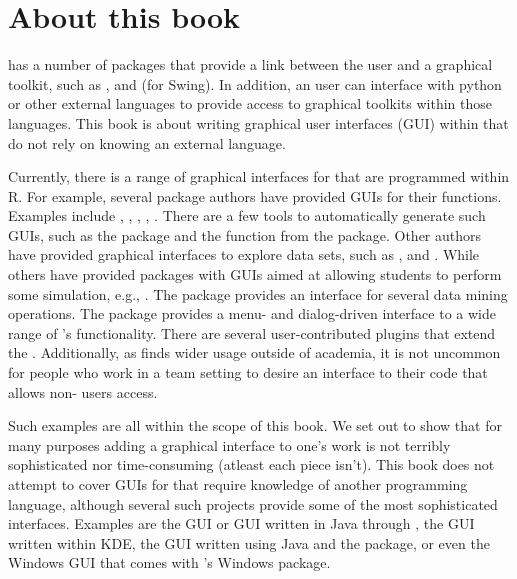 


\section*{About this book}
\label{sec:about}


\R\/ has a number of packages that provide a link between the \R\/
user and a graphical toolkit, such as ,  and
 (for Swing). In addition, an \R\/ user can interface with
python or other external languages to provide access to graphical
toolkits within those languages. This book is about writing graphical
user interfaces (GUI) within \R\/ that do not rely on knowing an
external language.  

Currently, there is a range of graphical interfaces for \R\/ that are
programmed within R. For example, several package authors have
provided GUIs for their functions. Examples include ,
, , , . There are a few tools to automatically generate such GUIs, such
as the  package and the  function
from the  package. Other authors have provided
graphical interfaces to explore data sets, such as ,
 and . While others have provided packages
with GUIs aimed at allowing students to perform some simulation, e.g.,
. The  package provides an interface
for several data mining operations. The  package provides a
menu- and dialog-driven interface to a wide range of \R's
functionality. There are several user-contributed plugins that extend
the . Additionally, as \R\/ finds wider usage outside of
academia, it is not uncommon for people who work in a team setting to
desire an interface to their \R\/ code that allows non-\R\/ users
access.

Such examples are all within the scope of this book. We set out to
show that for many purposes adding a graphical interface to one's work
is not terribly sophisticated nor time-consuming (atleast each piece
isn't).  This book does not attempt to cover GUIs for \R\/ that
require knowledge of another programming language, although several
such projects provide some of the most sophisticated
interfaces. Examples are the  GUI or  GUI written
in Java through , the  GUI written within KDE,
the  GUI written using Java and the  package,
or even the Windows GUI that comes with \R's Windows package.


